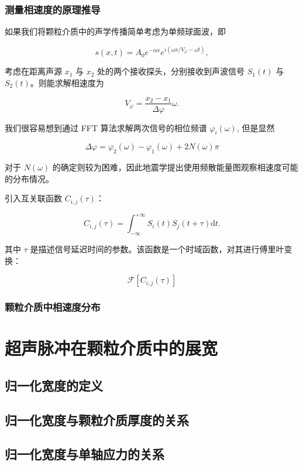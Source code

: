 \subsubsection{测量相速度的原理推导}

如果我们将颗粒介质中的声学传播简单考虑为单频球面波，即

\begin{equation}
  s(x,t) = A_{0}e^{-\alpha x}e^{i(\omega x/V_{\varphi}-\omega t)},
\end{equation}

考虑在距离声源 $x_{1}$ 与 $x_{2}$ 处的两个接收探头，分别接收到声波信号 $S_{1}(t)$ 与 $S_{2}(t)$。则能求解相速度为

\begin{equation}
  V_{\varphi} = \frac{x_{2}-x_{1}}{\Delta \varphi}\omega.
\end{equation}

我们很容易想到通过 FFT 算法求解两次信号的相位频谱 $\varphi_{i}(\omega)$, 但是显然

\begin{equation}
  \Delta \varphi = \varphi_{2}(\omega) - \varphi_{1}(\omega) + 2N(\omega)\pi
\end{equation}

对于 $N(\omega)$ 的确定则较为困难，因此地震学提出使用频散能量图观察相速度可能的分布情况。

引入互关联函数 $C_{i,j}(\tau)$：

\begin{equation}
  C_{i,j}(\tau) = \int_{-\infty}^{+\infty}S_{i}(t)S_{j}(t+\tau)\mathrm{d}t.
\end{equation}

其中 $\tau$ 是描述信号延迟时间的参数。该函数是一个时域函数，对其进行傅里叶变换：

\begin{equation}
  \mathcal{F}[C_{i,j}(\tau)]
\end{equation}

\subsubsection{颗粒介质中相速度分布}

\section{超声脉冲在颗粒介质中的展宽}

\subsection{归一化宽度的定义}

\subsection{归一化宽度与颗粒介质厚度的关系}

\subsection{归一化宽度与单轴应力的关系}

